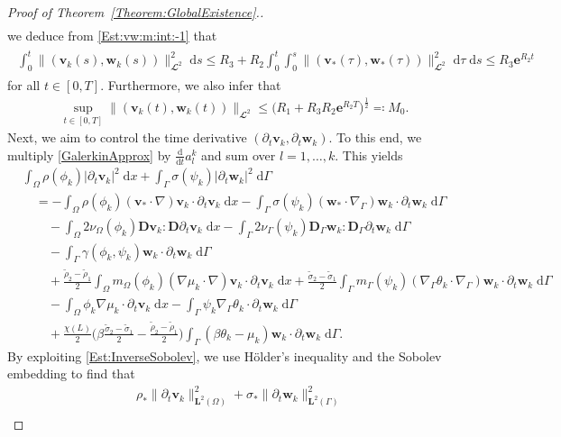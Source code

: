 \documentclass[10pt,reqno]{amsart}
\theoremstyle{remark}
\numberwithin{equation}{section}
\newcommand{\abs}[1]{| #1 |}
\newcommand{\norm}[1]{\| #1 \|}
\newcommand{\bv}{\mathbf{v}}
\newcommand{\bw}{\mathbf{w}}
\newcommand{\D}{\mathbf{D}}
\newcommand{\Dg}{\mathbf{D}_\Gamma}
\newcommand{\intO}{\int_\Omega}
\newcommand{\intG}{\int_\Gamma}
\newcommand{\dtau}{\;\mathrm d\tau}
\newcommand{\dx}{\;\mathrm{d}x}
\newcommand{\ds}{\;\mathrm ds}
\newcommand{\dG}{\;\mathrm d\Ga}
\newcommand{\ddt}{\frac{\mathrm d}{\mathrm dt}}
\newcommand{\delt}{\partial_{t}}
\newcommand{\Grad}{\nabla}
\newcommand{\Gradg}{\nabla_\Ga}
\newcommand{\e}{\mathbf{e}}
\newcommand{\Om}{\Omega}
\newcommand{\Ga}{\Gamma}
\begin{document}
\begin{proof}[Proof of Theorem~\ref{Theorem:GlobalExistence}.]
\begin{align}
\end{align}
we deduce from \eqref{Est:vw:m:int:-1} that
\begin{align}\label{Est:vw:m:int}
    \begin{split}
        \int_0^t \norm{(\bv_k(s),\bw_k(s))}_{\mathbfcal{L}^2}^2\ds \leq R_3 + R_2\int_0^t\int_0^s\norm{(\bv_\ast(\tau),\bw_\ast(\tau))}_{\mathbfcal{L}^2}^2\dtau\ds \leq R_3\e^{R_2t}
    \end{split}
\end{align}
for all $t\in[0,T]$. Furthermore, we also infer that
\begin{align}\label{Est:vw:m:sup}
    \sup_{t\in[0,T]} \norm{(\bv_k(t),\bw_k(t))}_{\mathbfcal{L}^2} \leq \big(R_1 + R_3R_2\e^{R_2T}\big)^{\frac12} \eqqcolon M_0.
\end{align}
Next, we aim to control the time derivative $(\delt\bv_k,\delt\bw_k)$. To this end, we multiply \eqref{GalerkinApprox} by $\ddt a_l^k$ and sum over $l=1,\ldots,k$. This yields
\begin{align*}
    &\intO \rho(\phi_k)\abs{\delt\bv_k}^2\dx + \intG \sigma(\psi_k)\abs{\delt\bw_k}^2\dG \nonumber \\
    &\quad = - \intO \rho(\phi_k)(\bv_\ast\cdot\Grad)\bv_k\cdot\delt\bv_k\dx - \intG \sigma(\psi_k)(\bw_\ast\cdot\Gradg)\bw_k\cdot\delt\bw_k\dG \nonumber \\
    &\qquad - \intO 2\nu_\Om(\phi_k)\D\bv_k:\D\delt\bv_k\dx - \intG 2\nu_\Ga(\psi_k)\Dg\bw_k:\Dg\delt\bw_k\dG \nonumber \\
    &\qquad - \intG \gamma(\phi_k,\psi_k)\bw_k\cdot\delt\bw_k\dG \\
    &\qquad + \frac{\tilde\rho_2 - \tilde\rho_1}{2}\intO m_\Om(\phi_k)(\Grad\mu_k\cdot\Grad)\bv_k\cdot\delt\bv_k\dx + \frac{\tilde\sigma_2 - \tilde\sigma_1}{2}\intG m_\Ga(\psi_k)(\Gradg\theta_k\cdot\Gradg)\bw_k\cdot\delt\bw_k\dG \nonumber \\
    &\qquad - \intO \phi_k\Grad\mu_k\cdot\delt\bv_k\dx - \intG \psi_k\Gradg\theta_k\cdot\delt\bw_k\dG \nonumber \\
    &\qquad + \frac{\chi(L)}{2}\Big(\beta\frac{\tilde\sigma_2 - \tilde\sigma_1}{2} - \frac{\tilde\rho_2 - \tilde\rho_1}{2}\Big)\intG (\beta\theta_k - \mu_k)\bw_k\cdot\delt\bw_k\dG. \nonumber
\end{align*}
By exploiting \eqref{Est:InverseSobolev}, we use Hölder's inequality and the Sobolev embedding to find that
\begin{align}\label{Est:Galerkin:Test:ddta}
    &\rho_\ast\norm{\delt\bv_k}_{\mathbf{L}^2(\Om)}^2 + \sigma_\ast\norm{\delt\bw_k}_{\mathbf{L}^2(\Ga)}^2 \nonumber \\[0.4em]

\end{align}
\end{proof}
\end{document}
